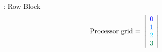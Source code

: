 \begin{frame}
\begin{exampleblock}{:  Row Block}
\begin{align*}
      \text{Processor grid = }\left|
      \begin{array}{l}
        \color{g11}0 \\
        \color{g12}1 \\
        \color{g13}2 \\
        \color{g21}3
      \end{array}
      \right| &
    \end{align*}
  \end{exampleblock}
\end{frame}


